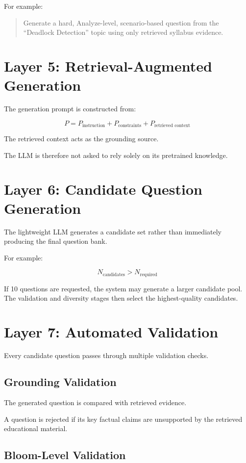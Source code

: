 \documentclass[12pt,a4paper]{report}
\begin{document}
For example:

\begin{quote}
Generate a hard, Analyze-level, scenario-based question from the ``Deadlock Detection'' topic using only retrieved syllabus evidence.
\end{quote}

\section{Layer 5: Retrieval-Augmented Generation}

The generation prompt is constructed from:

\[
P =
P_{\text{instruction}}
+
P_{\text{constraints}}
+
P_{\text{retrieved context}}
\]

The retrieved context acts as the grounding source.

The LLM is therefore not asked to rely solely on its pretrained knowledge.

\section{Layer 6: Candidate Question Generation}

The lightweight LLM generates a candidate set rather than immediately producing the final question bank.

For example:

\[
N_{\text{candidates}}
>
N_{\text{required}}
\]

If 10 questions are requested, the system may generate a larger candidate pool. The validation and diversity stages then select the highest-quality candidates.

\section{Layer 7: Automated Validation}

Every candidate question passes through multiple validation checks.

\subsection{Grounding Validation}

The generated question is compared with retrieved evidence.

A question is rejected if its key factual claims are unsupported by the retrieved educational material.

\subsection{Bloom-Level Validation}
\end{document}
